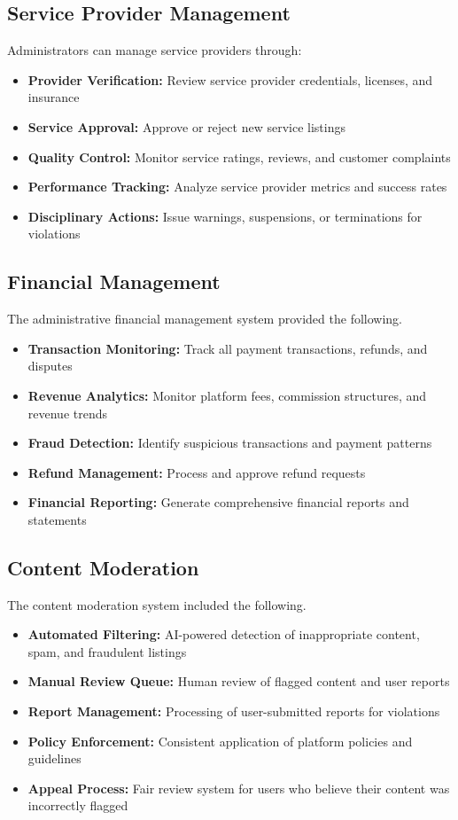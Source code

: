 \documentclass[conference]{IEEEtran}
\begin{document}
\subsection{Service Provider Management}
Administrators can manage service providers through:

\begin{itemize}
    \item \textbf{Provider Verification:} Review service provider credentials, licenses, and insurance
    \item \textbf{Service Approval:} Approve or reject new service listings
    \item \textbf{Quality Control:} Monitor service ratings, reviews, and customer complaints
    \item \textbf{Performance Tracking:} Analyze service provider metrics and success rates
    \item \textbf{Disciplinary Actions:} Issue warnings, suspensions, or terminations for violations
\end{itemize}

\subsection{Financial Management}
The administrative financial management system provided the following.

\begin{itemize}
    \item \textbf{Transaction Monitoring:} Track all payment transactions, refunds, and disputes
    \item \textbf{Revenue Analytics:} Monitor platform fees, commission structures, and revenue trends
    \item \textbf{Fraud Detection:} Identify suspicious transactions and payment patterns
    \item \textbf{Refund Management:} Process and approve refund requests
    \item \textbf{Financial Reporting:} Generate comprehensive financial reports and statements
\end{itemize}


\subsection{Content Moderation}
The content moderation system included the following.

\begin{itemize}
    \item \textbf{Automated Filtering:} AI-powered detection of inappropriate content, spam, and fraudulent listings
    \item \textbf{Manual Review Queue:} Human review of flagged content and user reports
    \item \textbf{Report Management:} Processing of user-submitted reports for violations
    \item \textbf{Policy Enforcement:} Consistent application of platform policies and guidelines
    \item \textbf{Appeal Process:} Fair review system for users who believe their content was incorrectly flagged
\end{itemize}
\end{document}
